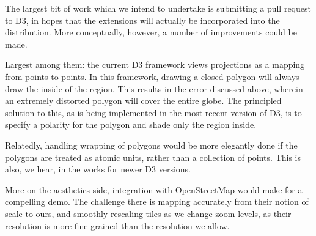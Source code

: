 The largest bit of work which we intend to undertake is submitting a pull
  request to D3, in hopes that the extensions will actually be incorporated into
  the distribution.
More conceptually, however, a number of improvements could be made.

Largest among them: the current D3 framework views projections as a mapping
  from points to points.
In this framework, drawing a closed polygon will always draw the inside of the
  region.
This results in the error discussed above, wherein an extremely distorted
  polygon will cover the entire globe.
The principled solution to this, as is being implemented in the most recent
  version of D3, is to specify a polarity for the polygon and shade only the
  region inside.

Relatedly, handling wrapping of polygons would be more elegantly done if the
  polygons are treated as atomic units, rather than a collection of points.
This is also, we hear, in the works for newer D3 versions.

More on the aesthetics side, integration with OpenStreetMap would make for a
  compelling demo.
The challenge there is mapping accurately from their notion of scale to ours,
  and smoothly rescaling tiles as we change zoom levels, as their resolution
   is more fine-grained than the resolution we allow.
